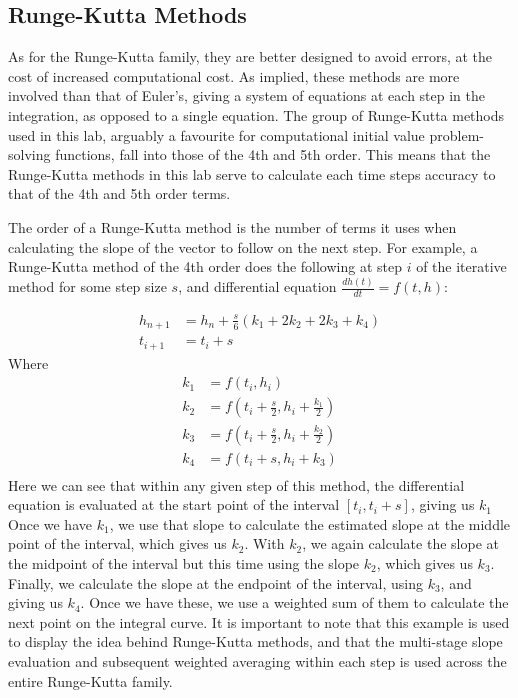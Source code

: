 \documentclass[11pt]{article}
\begin{document}
\subsection{Runge-Kutta Methods}
    As for the Runge-Kutta family, they are better designed to avoid errors, at the cost of increased computational cost.
    As implied, these methods are more involved than that of Euler's, giving a system of equations at each step in the integration, as opposed to a single equation.
    The group of Runge-Kutta methods used in this lab, arguably a favourite for computational initial value problem-solving functions, fall into those of the 4th and 5th order.
    This means that the Runge-Kutta methods in this lab serve to calculate each time steps accuracy to that of the 4th and 5th order terms.

  The order of a Runge-Kutta method is the number of terms it uses when calculating the slope of the vector to follow on the next step.
For example, a Runge-Kutta method of the 4th order does the following at step $i$ of the iterative method for some step size $s$, and differential equation $\frac{dh(t)}{dt} = f(t,h)$:

\[\begin{align}
    h_{n+1} &= h_n + \frac{s}{6}(k_1 + 2k_2 + 2k_3 + k_4)\\
    t_{i+1} &= t_i + s
\end{align}\]
Where
\[\begin{align}
    k_1 &= f(t_i, h_i)\\
    k_2 &= f(t_i + \frac{s}{2}, h_i + \frac{k_1}{2})\\
    k_3 &= f(t_i + \frac{s}{2}, h_i + \frac{k_2}{2})\\
    k_4 &= f(t_i + s, h_i + k_3)\\
\end{align}\]
Here we can see that within any given step of this method, the differential equation is evaluated at the start point of the interval $[t_i, t_i + s]$, giving us $k_1$
Once we have $k_1$, we use that slope to calculate the estimated slope at the middle point of the interval, which gives us $k_2$.
With $k_2$, we again calculate the slope at the midpoint of the interval but this time using the slope $k_2$, which gives us $k_3$.
Finally, we calculate the slope at the endpoint of the interval, using $k_3$, and giving us $k_4$.
Once we have these, we use a weighted sum of them to calculate the next point on the integral curve.
It is important to note that this example is used to display the idea behind Runge-Kutta methods, and that the multi-stage slope evaluation and subsequent weighted averaging within each step is used across the entire Runge-Kutta family.
\end{document}
